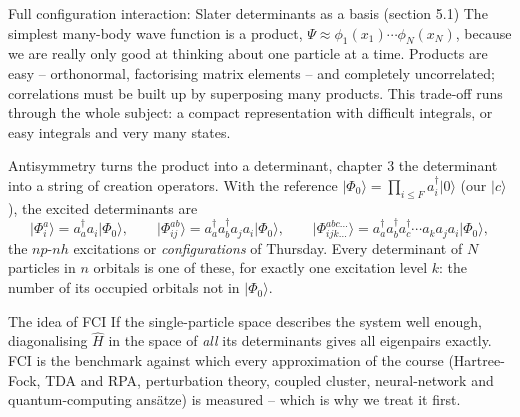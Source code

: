 \documentclass[aspectratio=169,10pt]{beamer}
\newcommand{\ket}[1]{\vert #1\rangle}
\begin{document}
\begin{frame}{Full configuration interaction: Slater determinants as a basis (section 5.1)}
  \small
  The simplest many-body wave function is a product, $\Psi\approx\phi_1(x_1)\cdots\phi_N(x_N)$, because we are really only good at thinking about one particle at a time. Products are easy -- orthonormal, factorising matrix elements -- and completely uncorrelated; correlations must be built up by \alert{superposing many products}. This trade-off runs through the whole subject: a compact representation with difficult integrals, or easy integrals and very many states.
  \vspace{0.2em}

  Antisymmetry turns the product into a determinant, chapter 3 the determinant into a string of creation operators. With the reference $\ket{\Phi_0}=\prod_{i\le F}a_i^{\dagger}\ket{0}$ (our $\ket{c}$), the excited determinants are
  \[
    \ket{\Phi_i^a}=a_a^{\dagger}a_i\ket{\Phi_0},\qquad
    \ket{\Phi_{ij}^{ab}}=a_a^{\dagger}a_b^{\dagger}a_ja_i\ket{\Phi_0},\qquad
    \ket{\Phi_{ijk\dots}^{abc\dots}}=a_a^{\dagger}a_b^{\dagger}a_c^{\dagger}\cdots a_ka_ja_i\ket{\Phi_0},
  \]
  the $np$-$nh$ excitations or \emph{configurations} of Thursday. Every determinant of $N$ particles in $n$ orbitals is one of these, for exactly one excitation level $k$: the number of its occupied orbitals not in $\ket{\Phi_0}$.
  \begin{block}{The idea of FCI}
    If the single-particle space describes the system well enough, diagonalising $\hat{H}$ in the space of \emph{all} its determinants gives all eigenpairs exactly. FCI is the benchmark against which every approximation of the course (Hartree-Fock, TDA and RPA, perturbation theory, coupled cluster, neural-network and quantum-computing ans\"atze) is measured -- which is why we treat it first.
  \end{block}
\end{frame}
\end{document}
